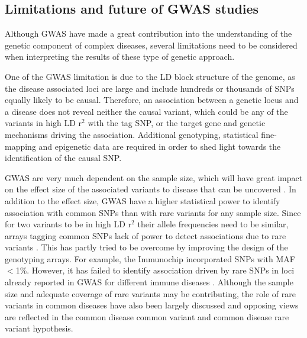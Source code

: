 
\subsection{Limitations and future of GWAS studies}
Although GWAS have made a great contribution into the understanding of the genetic component of complex diseases, several limitations need to be considered when interpreting the results of these type of genetic approach. 

One of the GWAS limitation is due to the LD block structure of the genome, as the disease associated loci are large and include hundreds or thousands of SNPs equally likely to be causal. Therefore, an association between a genetic locus and a disease does not reveal neither the causal variant, which could be any of the variants in high LD r$^2$ with the tag SNP, or the target gene and genetic mechanisms driving the association. Additional genotyping, statistical fine-mapping and epigenetic data are required in order to shed light towards the identification of the causal SNP.

GWAS are very much dependent on the sample size, which will have great impact on the effect size of the associated variants to disease that can be uncovered \parencite{Visscher2017}. In addition to the effect size, GWAS have a higher statistical power to identify association with common SNPs than with rare variants for any sample size. Since for two variants to be in high LD r$^2$ their allele frequencies need to be similar, arrays tagging common SNPs lack of power to detect associations due to rare variants \parencite{Wray2005}. This has partly tried to be overcome by improving the design of the genotyping arrays. For example, the Immunochip incorporated SNPs with MAF${<}$1\%. However, it has failed to identify association driven by rare SNPs in loci already reported in GWAS for different immune diseases \parencite{Visscher2017}. Although the sample size and adequate coverage of rare variants may be contributing, the role of rare variants in common diseases have also been largely discussed and opposing views are reflected in the common disease common variant and common disease rare variant hypothesis. 

